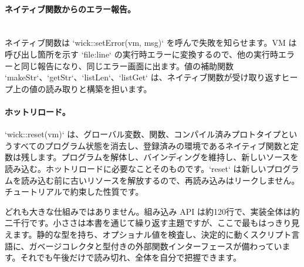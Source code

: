 \paragraph{ネイティブ関数からのエラー報告。}\mbox{}\\
ネイティブ関数は `wick::setError(vm, msg)` を呼んで失敗を知らせます。VM は呼び出し箇所を示す `file:line` の実行時エラーに変換するので、他の実行時エラーと同じ報告になり、同じエラー画面に出ます。値の補助関数 `makeStr`、`getStr`、`listLen`、`listGet` は、ネイティブ関数が受け取り返すヒープ上の値の読み取りと構築を担います。

\paragraph{ホットリロード。} `wick::reset(vm)` は、グローバル変数、関数、コンパイル済みプロトタイプというすべてのプログラム状態を消去し、登録済みの環境であるネイティブ関数と定数は残します。プログラムを解体し、バインディングを維持し、新しいソースを読み込む。ホットリロードに必要なことそのものです。`reset` は新しいプログラムを読み込む前に古いリソースを解放するので、再読み込みはリークしません。チュートリアルで約束した性質です。

どれも大きな仕組みではありません。組み込み API は約120行で、実装全体は約二千行です。小ささは本書を通じて繰り返す主題ですが、ここで最もはっきり見えます。静的な型を持ち、オプショナル値を検査し、決定的に動くスクリプト言語に、ガベージコレクタと型付きの外部関数インターフェースが備わっています。それでも午後だけで読み切れ、全体を自分で把握できます。

